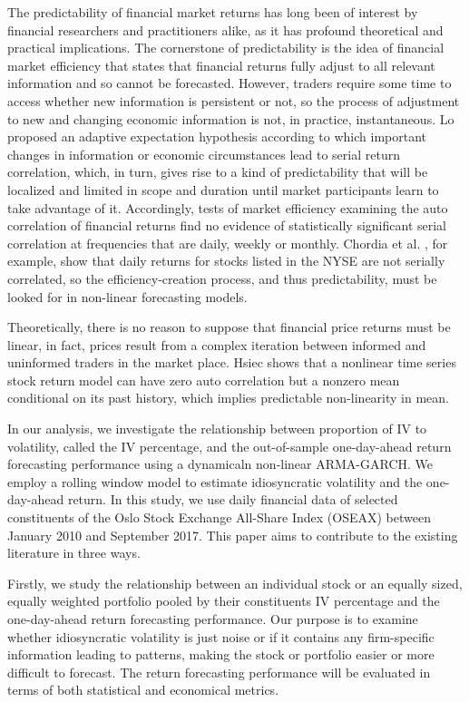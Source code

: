 The predictability of financial market returns has long been of interest by financial researchers and practitioners alike, as it has profound theoretical and practical implications. The cornerstone of predictability is the idea of financial market efficiency that states that financial returns fully adjust to all relevant information and so cannot be forecasted. However, traders require some time to access whether new information is persistent or not, so the process of adjustment to new and changing economic information is not, in practice, instantaneous. Lo \cite{Lo} proposed an adaptive expectation hypothesis according to which important changes in information or economic circumstances lead to serial return correlation, which, in turn, gives rise to a kind of predictability that will be localized and limited in scope and duration until market participants learn to take advantage of it. Accordingly, tests of market efficiency examining the auto correlation of financial returns find no evidence of statistically significant serial correlation at frequencies that are daily, weekly or monthly. Chordia et al. \cite{Chordiaetal}, for example, show that daily returns for stocks listed in the NYSE are not serially correlated, so the efficiency-creation process, and thus predictability, must be looked for in non-linear forecasting models. 

Theoretically, there is no reason to suppose that financial price returns must be linear, in fact, prices result from a complex iteration between informed and uninformed traders in the market place. Hsiec \cite{Hsiec1} \cite{Hsiec2} shows that a nonlinear time series stock return model can have zero auto correlation but a nonzero mean conditional on its past history, which implies predictable non-linearity in mean.

In our analysis, we investigate the relationship between proportion of IV to volatility, called the IV percentage, and the out-of-sample one-day-ahead return forecasting performance using a dynamicaln non-linear ARMA-GARCH. We employ a rolling window model to estimate idiosyncratic volatility and the one-day-ahead return. In this study, we use daily financial data of selected constituents of the Oslo Stock Exchange All-Share Index (OSEAX) between January 2010 and September 2017. This paper aims to contribute to the existing literature in three ways. 

Firstly, we study the relationship between an individual stock or an equally sized, equally weighted portfolio pooled by their constituents IV percentage and the one-day-ahead return forecasting performance. Our purpose is to examine whether idiosyncratic volatility is just noise or if it contains any firm-specific information leading to patterns, making the stock or portfolio easier or more difficult to forecast. The return forecasting performance will be evaluated in terms of both statistical and economical metrics.

